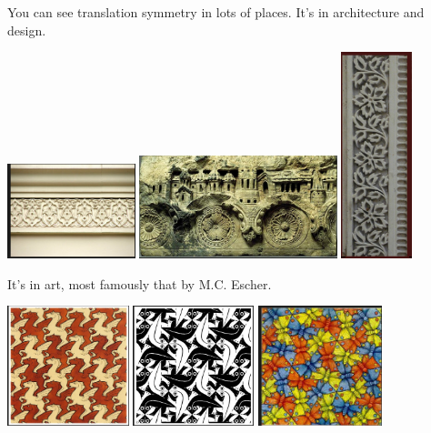 You can see translation symmetry in lots of places.  It's in architecture and design.
\begin{center}
\includegraphics[height=2.75cm]{frieze1}
\quad
\includegraphics[height=3cm]{frieze2}
\quad
\includegraphics[height=6cm]{frieze5}

\end{center}



\noindent
It's in art, most famously that by M.C. Escher.

\begin{center}
\includegraphics[height=3.5cm]{escher1}
\quad
\includegraphics[height=3.5cm]{escher2}
\quad
\includegraphics[height=3.5cm]{escher4}

\end{center}


